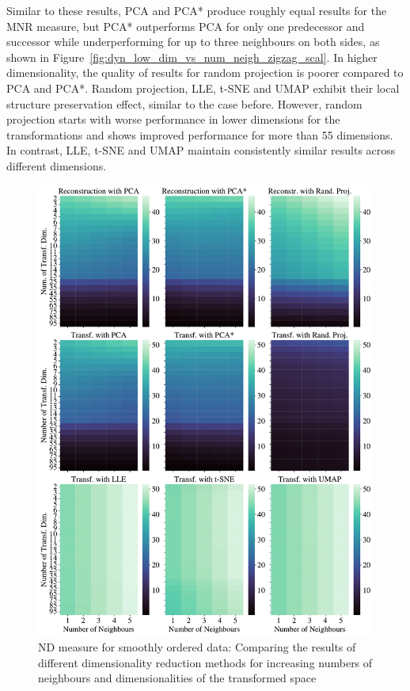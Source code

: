 \documentclass[pdftex,12pt,a4paper]{report}
\begin{document}
Similar to these results, PCA and PCA* produce roughly equal results for the MNR measure, but PCA* outperforms PCA for only one predecessor and successor while underperforming for up to three neighbours on both sides, as shown in Figure~\ref{fig:dyn_low_dim_vs_num_neigh_zigzag_scal}.
In higher dimensionality, the quality of results for random projection is poorer compared to PCA and PCA*.
Random projection, LLE, t-SNE and UMAP exhibit their local structure preservation effect, similar to the case before.
However, random projection starts with worse performance in lower dimensions for the transformations and shows improved performance for more than 55 dimensions. 
In contrast,  LLE, t-SNE and UMAP maintain consistently similar results across different dimensions.

\begin{figure}[htb!]
    \includegraphics*[width= \textwidth]{images/multiple_runs/one_line/dyn_low_dim_vs_num_neigh/euclidean/all_methods_10runs_5lines_100points_5neighbours.pdf}
    \caption{ND measure for smoothly ordered data: Comparing the results of different dimensionality reduction methods for increasing numbers of neighbours and dimensionalities of the transformed space} \label{fig:dyn_low_dim_vs_num_neigh_oneline}
\end{figure}
\end{document}

